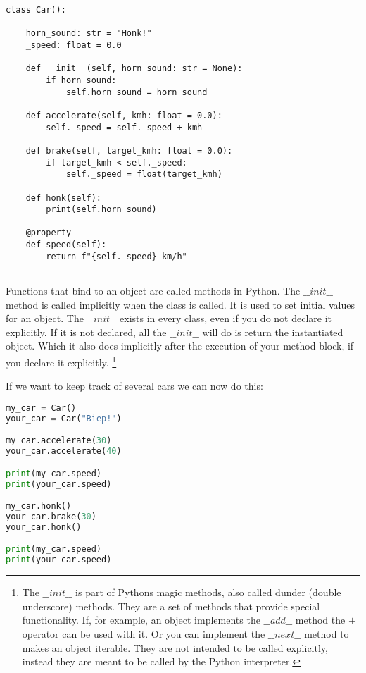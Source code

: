 \documentclass{article}
\begin{document}
\begin{lstlisting}
class Car():

    horn_sound: str = "Honk!"
    _speed: float = 0.0

    def __init__(self, horn_sound: str = None):
        if horn_sound:
            self.horn_sound = horn_sound

    def accelerate(self, kmh: float = 0.0):
        self._speed = self._speed + kmh

    def brake(self, target_kmh: float = 0.0):
        if target_kmh < self._speed:
            self._speed = float(target_kmh)

    def honk(self):
        print(self.horn_sound)

    @property
    def speed(self):
        return f"{self._speed} km/h"


\end{lstlisting}

Functions that bind to an object are called methods in Python.
The $\_\_init\_\_$ method is called implicitly when the class is called.
It is used to set initial values for an object.
The $\_\_init\_\_$ exists in every class, even if you do not declare it explicitly.
If it is not declared, all the $\_\_init\_\_$ will do is return the instantiated object.
Which it also does implicitly after the execution of your method block,
if you declare it explicitly.
\footnote{The $\_\_init\_\_$ is part of Pythons magic methods,
    also called dunder (double underscore) methods.
    They are a set of methods that provide special functionality.
    If, for example, an object implements the $\_\_add\_\_$ method the $+$ operator
    can be used with it.
    Or you can implement the $\_\_next\_\_$ method to makes an object iterable.
    They are not intended to be called explicitly, instead they are meant to be
    called by the Python interpreter.}

If we want to keep track of several cars we can now do this:

\begin{lstlisting}[language=python]
my_car = Car()
your_car = Car("Biep!")

my_car.accelerate(30)
your_car.accelerate(40)

print(my_car.speed)
print(your_car.speed)

my_car.honk()
your_car.brake(30)
your_car.honk()

print(my_car.speed)
print(your_car.speed)
\end{lstlisting}
\end{document}
